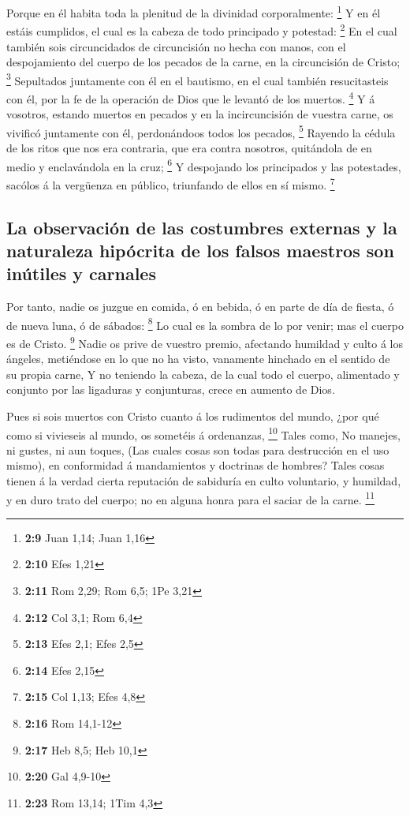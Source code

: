  Porque en él habita toda la plenitud de la divinidad
corporalmente: \footnote{\textbf{2:9} Juan 1,14; Juan 1,16}
 Y en él estáis cumplidos, el cual es la cabeza de todo
principado y potestad: \footnote{\textbf{2:10} Efes 1,21} 
En el cual también sois circuncidados de circuncisión no hecha con
manos, con el despojamiento del cuerpo de los pecados de la carne, en la
circuncisión de Cristo; \footnote{\textbf{2:11} Rom 2,29; Rom 6,5; 1Pe
  3,21}  Sepultados juntamente con él en el bautismo, en el
cual también resucitasteis con él, por la fe de la operación de Dios que
le levantó de los muertos. \footnote{\textbf{2:12} Col 3,1; Rom 6,4}
 Y á vosotros, estando muertos en pecados y en la
incircuncisión de vuestra carne, os vivificó juntamente con él,
perdonándoos todos los pecados, \footnote{\textbf{2:13} Efes 2,1; Efes
  2,5}  Rayendo la cédula de los ritos que nos era
contraria, que era contra nosotros, quitándola de en medio y
enclavándola en la cruz; \footnote{\textbf{2:14} Efes 2,15}
 Y despojando los principados y las potestades, sacólos á
la vergüenza en público, triunfando de ellos en sí mismo. \footnote{\textbf{2:15}
  Col 1,13; Efes 4,8}

\hypertarget{la-observaciuxf3n-de-las-costumbres-externas-y-la-naturaleza-hipuxf3crita-de-los-falsos-maestros-son-inuxfatiles-y-carnales}{%
\subsection{La observación de las costumbres externas y la naturaleza
hipócrita de los falsos maestros son inútiles y
carnales}\label{la-observaciuxf3n-de-las-costumbres-externas-y-la-naturaleza-hipuxf3crita-de-los-falsos-maestros-son-inuxfatiles-y-carnales}}

 Por tanto, nadie os juzgue en comida, ó en bebida, ó en
parte de día de fiesta, ó de nueva luna, ó de sábados: \footnote{\textbf{2:16}
  Rom 14,1-12}  Lo cual es la sombra de lo por venir; mas
el cuerpo es de Cristo. \footnote{\textbf{2:17} Heb 8,5; Heb 10,1}
 Nadie os prive de vuestro premio, afectando humildad y
culto á los ángeles, metiéndose en lo que no ha visto, vanamente
hinchado en el sentido de su propia carne,  Y no teniendo
la cabeza, de la cual todo el cuerpo, alimentado y conjunto por las
ligaduras y conjunturas, crece en aumento de Dios.

 Pues si sois muertos con Cristo cuanto á los rudimentos
del mundo, ¿por qué como si vivieseis al mundo, os sometéis á
ordenanzas, \footnote{\textbf{2:20} Gal 4,9-10}  Tales
como, No manejes, ni gustes, ni aun toques,  (Las cuales
cosas son todas para destrucción en el uso mismo), en conformidad á
mandamientos y doctrinas de hombres?  Tales cosas tienen á
la verdad cierta reputación de sabiduría en culto voluntario, y
humildad, y en duro trato del cuerpo; no en alguna honra para el saciar
de la carne. \footnote{\textbf{2:23} Rom 13,14; 1Tim 4,3}

